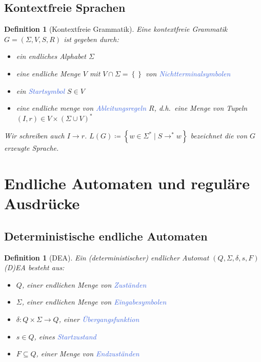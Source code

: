 \documentclass[11pt]{scrartcl}
\newcommand{\tcol}[1]{\textcolor{RoyalBlue}{#1}}
\newcommand{\set}[1]{\left\lbrace #1\right\rbrace}
\theoremstyle{break}
\newtheorem{defi}[satz]{Definition}
\begin{document}
    \subsection{Kontextfreie Sprachen}
	\label{subsec:kontextfreie-sprachenindex}

    \begin{defi}[Kontextfreie Grammatik]
        Eine kontextfreie Grammatik $G=(\Sigma ,V,S,R)$ ist gegeben durch:
        \begin{itemize}
            \item ein endliches Alphabet $\Sigma$
            \item eine endliche Menge $V$ mit $V\cap\Sigma = \set{}$ von \tcol{Nichtterminalsymbolen}
            \item ein \tcol{Startsymbol} $S\in V$
            \item eine endliche menge von \tcol{Ableitungsregeln} $R$, d.h.\ eine Menge von Tupeln $(I,r)\in V\times (\Sigma\cup V)^*$
        \end{itemize}
        Wir schreiben auch $I\rightarrow r$. $L(G)\coloneqq \set{w\in\Sigma^*\mid S\rightarrow^*w}$ bezeichnet die von $G$ erzeugte Sprache.
    \end{defi}



    \section{Endliche Automaten und reguläre Ausdrücke}
	\label{sec:endliche-automatenindexund-reguläre-ausdrückeindex}


    \subsection{Deterministische endliche Automaten}
	\label{subsec:deterministische-endliche-automatenindex}

    \begin{defi}[DEA]
        Ein (deterministischer) endlicher Automat $(Q,\Sigma ,\delta ,s,F)$ (D)EA besteht aus:
        \begin{itemize}
            \item $Q$, einer endlichen Menge von \tcol{Zuständen}
            \item $\Sigma$, einer endlichen Menge von \tcol{Eingabesymbolen}
            \item $\delta\colon Q\times\Sigma\to Q$, einer \tcol{Übergangsfunktion}
            \item $s\in Q$, eines \tcol{Startzustand}
            \item $F\subseteq Q$, einer Menge von \tcol{Endzuständen}
        \end{itemize}
    \end{defi}
\end{document}
